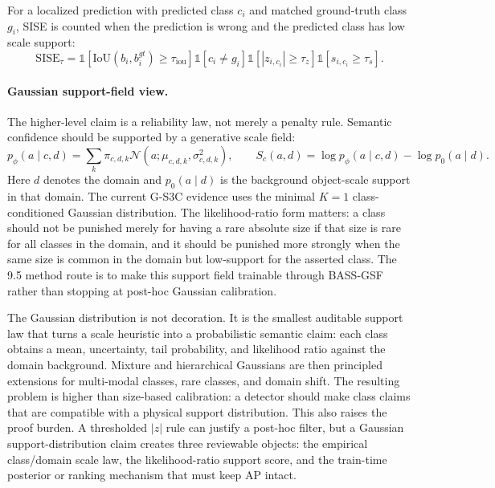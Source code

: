 \documentclass[10pt]{article}
\newcommand{\sise}{\mathrm{SISE}}
\begin{document}
For a localized prediction with predicted class $c_i$ and matched ground-truth
class $g_i$, SISE is counted when the prediction is wrong and the predicted
class has low scale support:
\begin{equation}
  \sise_{\tau} =
  \mathbb{1}[\mathrm{IoU}(b_i,b_i^{gt}) \ge \tau_{\mathrm{iou}}]
  \mathbb{1}[c_i \ne g_i]
  \mathbb{1}[|z_{i,c_i}| \ge \tau_z]
  \mathbb{1}[s_{i,c_i} \ge \tau_s].
\end{equation}

\paragraph{Gaussian support-field view.}
The higher-level claim is a reliability law, not merely a penalty rule.
Semantic confidence should be supported by a generative scale field:
\begin{equation}
  p_\phi(a\mid c,d)=\sum_k \pi_{c,d,k}
  \mathcal{N}(a;\mu_{c,d,k},\sigma^2_{c,d,k}), \qquad
  S_c(a,d)=\log p_\phi(a\mid c,d)-\log p_0(a\mid d).
\end{equation}
Here $d$ denotes the domain and $p_0(a\mid d)$ is the background object-scale
support in that domain.  The current G-S3C evidence uses the minimal $K=1$
class-conditioned Gaussian distribution.  The likelihood-ratio form matters: a class should
not be punished merely for having a rare absolute size if that size is rare for
all classes in the domain, and it should be punished more strongly when the
same size is common in the domain but low-support for the asserted class.  The
9.5 method route is to make this support field trainable through BASS-GSF
rather than stopping at post-hoc Gaussian calibration.

The Gaussian distribution is not decoration.  It is the smallest auditable
support law that turns a scale heuristic into a probabilistic semantic claim:
each class obtains a mean, uncertainty, tail probability, and likelihood ratio
against the domain background.  Mixture and hierarchical Gaussians are then
principled extensions for multi-modal classes, rare classes, and domain shift.
The resulting problem is higher than size-based calibration: a detector should
make class claims that are compatible with a physical support distribution.
This also raises the proof burden.  A thresholded $|z|$ rule can justify a
post-hoc filter, but a Gaussian support-distribution claim creates three
reviewable objects: the empirical class/domain scale law, the likelihood-ratio
support score, and the train-time posterior or ranking mechanism that must keep
AP intact.
\end{document}
